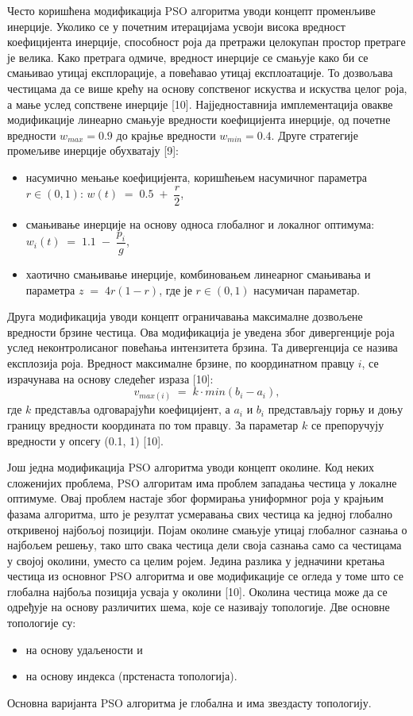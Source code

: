 \documentclass[12pt]{article}
\begin{document}
Често коришћена модификација PSO алгоритма уводи концепт променљиве инерције. Уколико се у почетним итерацијама усвоји висока вредност коефицијента инерције, способност роја да претражи целокупан простор претраге је велика. Како претрага одмиче, вредност инерције се смањује како би се смањивао утицај експлорације, а повећавао утицај експлоатације. То дозвољава честицама да се више крећу на основу сопственог искуства и искуства целог роја, а мање услед сопствене инерције [10]. Најједноставнија имплементација овакве модификације линеарно смањује вредности коефицијента инерције, од почетне вредности $w_{max}=0.9$ до крајње вредности $w_{min}=0.4$. Друге стратегије промељиве инерције обухватају [9]:
\begin{itemize}
    \item насумично мењање коефицијента, коришћењем насумичног параметра $r\in(0,1)$: $w(t)\;=\;0.5\;+\;\dfrac{r}{2}$,
    \item смањивање инерције на основу односа глобалног и локалног оптимума: $w_i(t)\;=\;1.1\;-\;\dfrac{p_i}{g}$,
    \item хаотично смањивање инерције, комбиновањем линеарног смањивања и параметра \newline$z\;=\;4r(1-r)$, где је $r\in(0,1)$ насумичан параметар.
\end{itemize}
\newpage
Друга модификација уводи концепт ограничавања максималне дозвољене вредности брзине честица. Ова модификација је уведена због дивергенције роја услед неконтролисаног повећања интензитета брзина. Та дивергенција се назива експлозија роја. Вредност максималне брзине, по координатном правцу $i$, се израчунава на основу следећег израза [10]:
\begin{equation}
    v_{max(i)}\;=\;k\cdot min(b_i - a_i),
\end{equation}
где $k$ представља одговарајући коефицијент, а $a_i$ и $b_i$ представљају горњу и доњу границу вредности координата по том правцу. За параметар $k$ се препоручују вредности у опсегу \newline(0.1, 1) [10].

Још једна модификација PSO алгоритма уводи концепт околине. Код неких сложенијих проблема, PSO алгоритам има проблем западања честица у локалне оптимуме. Овај проблем настаје због формирања униформног роја у крајњим фазама алгоритма, што је резултат усмеравања свих честица ка једној глобално откривеној најбољој позицији. Појам околине смањује утицај глобалног сазнања о најбољем решењу, тако што свака честица дели своја сазнања само са честицама у својој околини, уместо са целим ројем. Једина разлика у једначини кретања честица из основног PSO алгоритма и ове модификације се огледа у томе што се глобална најбоља позиција усваја у околини [10]. Околина честица може да се одређује на основу различитих шема, које се називају топологије. Две основне топологије су:
\begin{itemize}
    \item на основу удаљености и
    \item на основу индекса (прстенаста топологија).
\end{itemize}
Основна варијанта PSO алгоритма је глобална и има звездасту топологију.
\end{document}
